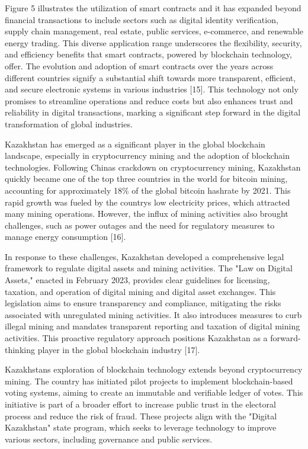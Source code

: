 \begin{multicols}{2}
Figure 5 illustrates the utilization of smart contracts and it has
expanded beyond financial transactions to include sectors such as
digital identity verification, supply chain management, real estate,
public services, e-commerce, and renewable energy trading. This diverse
application range underscores the flexibility, security, and efficiency
benefits that smart contracts, powered by blockchain technology, offer.
The evolution and adoption of smart contracts over the years across
different countries signify a substantial shift towards more
transparent, efficient, and secure electronic systems in various
industries {[}15{]}. This technology not only promises to streamline
operations and reduce costs but also enhances trust and reliability in
digital transactions, marking a significant step forward in the digital
transformation of global industries.

Kazakhstan has emerged as a significant player in the global blockchain
landscape, especially in cryptocurrency mining and the adoption of
blockchain technologies. Following China\textquotesingle s crackdown on
cryptocurrency mining, Kazakhstan quickly became one of the top three
countries in the world for bitcoin mining, accounting for approximately
18\% of the global bitcoin hashrate by 2021. This rapid growth was
fueled by the country\textquotesingle s low electricity prices, which
attracted many mining operations. However, the influx of mining
activities also brought challenges, such as power outages and the need
for regulatory measures to manage energy consumption {[}16{]}.

In response to these challenges, Kazakhstan developed a comprehensive
legal framework to regulate digital assets and mining activities. The
"Law on Digital Assets," enacted in February 2023, provides clear
guidelines for licensing, taxation, and operation of digital mining and
digital asset exchanges. This legislation aims to ensure transparency
and compliance, mitigating the risks associated with unregulated mining
activities. It also introduces measures to curb illegal mining and
mandates transparent reporting and taxation of digital mining
activities. This proactive regulatory approach positions Kazakhstan as a
forward-thinking player in the global blockchain industry\hspace{0pt}
{[}17{]}.

Kazakhstan\textquotesingle s exploration of blockchain technology
extends beyond cryptocurrency mining. The country has initiated pilot
projects to implement blockchain-based voting systems, aiming to create
an immutable and verifiable ledger of votes. This initiative is part of
a broader effort to increase public trust in the electoral process and
reduce the risk of fraud. These projects align with the "Digital
Kazakhstan" state program, which seeks to leverage technology to improve
various sectors, including governance and public services.


\end{multicols}
